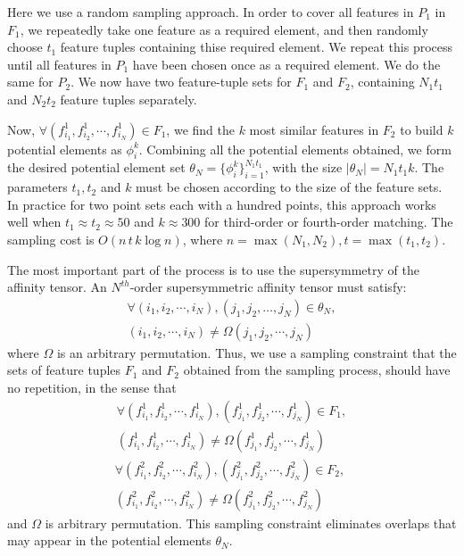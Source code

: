 Here we use a random sampling approach. In order to cover all features in $P_1$ in $F_1$,  we repeatedly take one feature as a required element,
and then  randomly choose $t_1$ feature tuples containing thise required element.
We repeat this process until all features in $P_1$ have been chosen once as a required element.
We do the same for $P_2$. We now have two feature-tuple sets for $F_1$ and $F_2$, containing $N_1 t_1$ and $N_2 t_2$ feature tuples separately.

Now, $\forall (f_{i_1}^1, f_{i_2}^1, \cdots, f_{i_N}^1)\in F_1$, we find the $k$ most similar features in $F_2$ to build $k$ potential elements as $\phi_i^k$.
Combining all the potential elements obtained, we form the desired potential element set $\theta_N = \{\phi_i^k\}_{i=1}^{N_1 t_1}$, with the size $|\theta_N| = N_1 t_1 k$.
The parameters $t_1, t_2$ and $k$ must be chosen according to the size of the feature sets. In practice for two point sets each with a hundred points, this approach works well when $t_1 \approx t_2 \approx 50$ and $k \approx 300$ for third-order or fourth-order matching.
The sampling cost is $O(n\, t\,  k\log n)$, where $n=\max(N_1, N_2), t=\max(t_1, t_2)$.

The most important part of the  process is to use the supersymmetry of the affinity tensor.
An $N^{th}$-order supersymmetric affinity tensor must satisfy:
\begin{eqnarray}
\label{equ:noredun}
\forall (i_1,i_2,\cdots,i_N),(j_1,j_2,\ldots,j_N) \in \theta_N,\nonumber\\(i_1,i_2,\cdots,i_N)\neq\Omega(j_1,j_2,\cdots,j_N)
\end{eqnarray}
where $\Omega$ is an arbitrary permutation.
Thus, we use a sampling constraint that the sets of feature tuples $F_1$ and $F_2$ obtained from the sampling process, should have no repetition, in the sense that
\begin{eqnarray}
\label{equ:noredun2}
\forall (f_{i_1}^1,f_{i_2}^1,\cdots,f_{i_N}^1),(f_{j_1}^1,f_{j_2}^1,\cdots,f_{j_N}^1) \in F_1,\nonumber\\ (f_{i_1}^1,f_{i_2}^1,\cdots,f_{i_N}^1)\neq\Omega(f_{j_1}^1,f_{j_2}^1,\cdots,f_{j_N}^1)
\end{eqnarray}
\begin{eqnarray}
\label{equ:noredun3}
\forall (f_{i_1}^2,f_{i_2}^2,\cdots,f_{i_N}^2),(f_{j_1}^2,f_{j_2}^2,\cdots,f_{j_N}^2) \in F_2,\;\nonumber\\ (f_{i_1}^2,f_{i_2}^2,\cdots,f_{i_N}^2)\neq\Omega(f_{j_1}^2,f_{j_2}^2,\cdots,f_{j_N}^2)
\end{eqnarray}
and $\Omega$ is arbitrary permutation.
This sampling constraint eliminates overlaps that may appear in the potential elements $\theta_N$.

